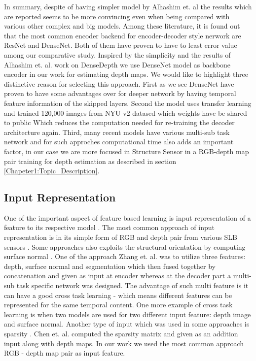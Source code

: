 In summary, despite of having simpler model by Alhashim et. al \cite{Alhashim2018}  the results which are reported seems to be more convincing even when being compared with various other complex and big models. Among these literature, it is found out that the most common encoder backend for encoder-decoder style nerwork are  ResNet and DenseNet. Both of them have proven to have to least error value among our comparative study. Inspired by the simplicity and the results of  Alhashim et. al. work on DenseDepth we use DenseNet model as backbone encoder in our work for estimating depth maps. We would like to highlight three distinctive reason for selecting this approach. First as we see DenseNet have proven to have some advantages over for deeper network by having temporal feature information of the skipped layers. Second the model uses transfer learning and trained 120,000 images from NYU v2 datased which weights have be shared to public Which reduces the computation needed for re-training the decoder architecture again. Third, many recent models have various multi-sub task network and for such approches computational time also adds an important factor, in our case we are more focused in Structure Sensor in a RGB-depth map pair training for depth estimation as described in section \ref{Chapeter1:Topic_Description}.


\subsection{Input Representation}
One of the important aspect of feature based learning is input representation of a feature to its respective model \cite{friedman2001elements}. The most common approach of input representation is in its simple form of RGB and depth pair from various SLB sensors \cite{eigen2014depth, xu2017multi}. Some approaches also exploits the structural orientation by computing surface normal \cite{li2015depth, qi2018geonet}. One of the approach Zhang et. al. \cite{Zhang_2019_CVPR} was to utilize three features:  depth, surface normal and segmentation which then fused together by concatenation and given as input at encoder whereas at the decoder part a multi-sub task specific network was designed. The advantage of such multi feature is it can have a good cross task learning - which means different features can be represented for the same temporal content. One more example of  cross task learning is \cite{qi2018geonet} when two models are used for two different input feature: depth image and surface normal. Another type of input which was used in some approaches is sparsity  \cite{chen2018estimating, mal2018sparse}. Chen et. al. \cite{chen2018estimating} computed the sparsity matrix and given as an addition input along with depth maps. In our work we used the most common approach RGB - depth map pair as input feature.  

